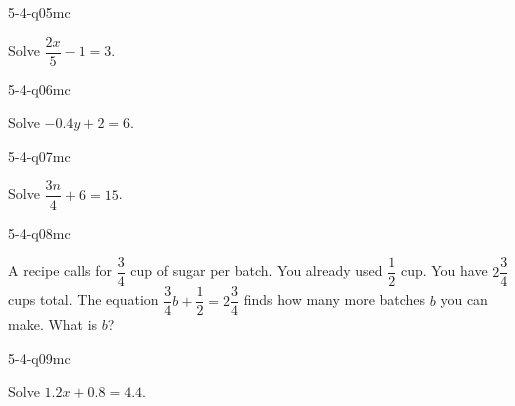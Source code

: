 \begin{practiceQuestion}{5-4-q05}{mc}
\begin{questionText}
Solve $\dfrac{2x}{5} - 1 = 3$.
\end{questionText}
\end{practiceQuestion}

\begin{practiceQuestion}{5-4-q06}{mc}
\begin{questionText}
Solve $-0.4y + 2 = 6$.
\end{questionText}
\end{practiceQuestion}

\begin{practiceQuestion}{5-4-q07}{mc}
\begin{questionText}
Solve $\dfrac{3n}{4} + 6 = 15$.
\end{questionText}
\end{practiceQuestion}

\begin{practiceQuestion}{5-4-q08}{mc}
\begin{questionText}
A recipe calls for $\dfrac{3}{4}$ cup of sugar per batch. You already used $\dfrac{1}{2}$ cup. You have $2\dfrac{3}{4}$ cups total. The equation $\dfrac{3}{4}b + \dfrac{1}{2} = 2\dfrac{3}{4}$ finds how many more batches $b$ you can make. What is $b$?
\end{questionText}
\end{practiceQuestion}

\begin{practiceQuestion}{5-4-q09}{mc}
\begin{questionText}
Solve $1.2x + 0.8 = 4.4$.
\end{questionText}
\end{practiceQuestion}

